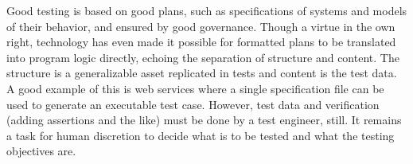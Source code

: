 \documentclass[12pt,a4paper,oneside,pdftex]{report}
\begin{document}
{Good testing is based on good plans, such as specifications of systems and models of their behavior, and ensured by good governance. Though a virtue in the own right, technology has even made it possible for formatted plans to be translated into program logic directly, echoing the separation of structure and content. The structure is a generalizable asset replicated in tests and content is the test data. A good example of this is web services where a single specification file can be used to generate an executable test case. However, test data and verification (adding assertions and the like) must be done by a test engineer, still. It remains a task for human discretion to decide what is to be tested and what the testing objectives are.


\begin{comment}
Inconsistent interpretation of parameters or values
Violations of value domains or of capacity or size limits
Side-effects on parameters or resrouces
Missing or misunderstood functionality
Nonfinctional problems
Dynamic mismatches
\end{comment}

\begin{comment}
Interpretation
    wrong function - something else than specified
    extra function - more than what is expected/needed
    missing function - not all that is specified
Miscoded call (error which causes the developer to place the call instruction at the wrong point in the program)
    Extra instruction fault: the call instruction is on a path which should not have the call.
    Wrong placement fault: the call is at the wrong location on the path which should have the call instruction.
    Missing instruction fault: the call instruction is missing on the path which should have the call.
Interface error
    When stardards or agreements are violated
\end{comment}



}
\end{document}
